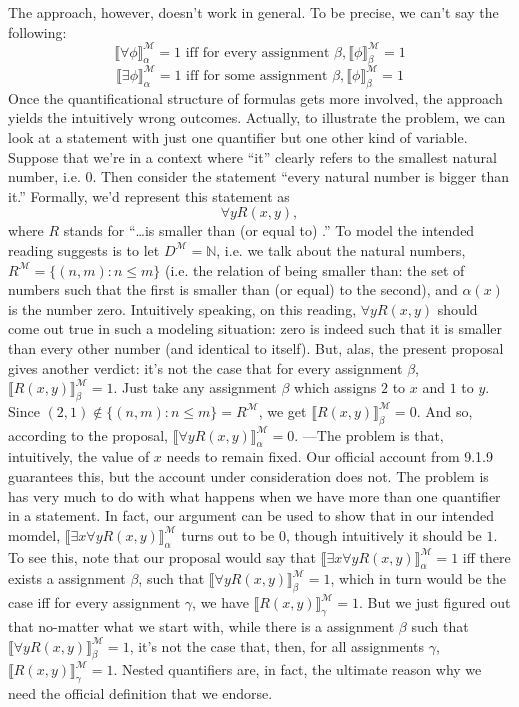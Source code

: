 \begin{enumerate}[\thesection.1]
	The approach, however, doesn't work in general. To be precise, we can't say the following:
	 \[\llbracket \forall \phi\rrbracket^\mathcal{M}_\alpha=1\text{ iff for every assignment }\beta, \llbracket \phi\rrbracket^\mathcal{M}_\beta=1\]
	  \[\llbracket \exists \phi\rrbracket^\mathcal{M}_\alpha=1\text{ iff for some assignment }\beta, \llbracket \phi\rrbracket^\mathcal{M}_\beta=1\]
	Once the quantificational structure of formulas gets more involved, the approach yields the intuitively wrong outcomes. Actually, to illustrate the problem, we can look at a statement with just one quantifier but one other kind of variable. Suppose that we're in a context where ``it'' clearly refers to the smallest natural number, i.e. 0. Then consider the statement ``every natural number is bigger than it.'' Formally, we'd represent this statement as \[\forall yR(x,y),\] where $R$ stands for ``\dots is smaller than (or equal to) \underline{\phantom{\dots}}.'' To model the intended reading suggests is to let $D^\mathcal{M}=\mathbb{N}$, i.e. we talk about the natural numbers, $R^\mathcal{M}=\{(n,m):n\leq m\}$ (i.e. the relation of being smaller than: the set of numbers such that the first is smaller than (or equal) to the second), and $\alpha(x)$ is the number zero. Intuitively speaking, on this reading, $\forall yR(x,y)$ should come out true in such a modeling situation: zero is indeed such that it is smaller than every other number (and identical to itself). But, alas, the present proposal gives another verdict: it's not the case that for every assignment $\beta$, $\llbracket R(x,y)\rrbracket^\mathcal{M}_\beta=1$. Just take any assignment $\beta$ which assigns $2$ to $x$ and $1$ to $y$. Since $(2,1)\notin \{(n,m):n\leq m\}=R^\mathcal{M}$, we get $\llbracket R(x,y)\rrbracket^\mathcal{M}_\beta=0$. And so, according to the proposal, $\llbracket \forall yR(x,y)\rrbracket^\mathcal{M}_\alpha=0$. ---The problem is that, intuitively, the value of $x$ needs to remain fixed. Our official account from 9.1.9 guarantees this, but the account under consideration does not. The problem is has very much to do with what happens when we have more than one quantifier in a statement. In fact, our argument can be used to show that in our intended momdel,  $\llbracket \exists x\forall yR(x,y)\rrbracket^\mathcal{M}_\alpha$ turns out to be $0$, though intuitively it should be $1$. To see this, note that our proposal would say that $\llbracket \exists x\forall yR(x,y)\rrbracket^\mathcal{M}_\alpha=1$ iff there exists a assignment $\beta$, such that $\llbracket \forall yR(x,y)\rrbracket^\mathcal{M}_\beta=1$, which in turn would be the case iff for every assignment $\gamma$, we have $\llbracket R(x,y)\rrbracket^\mathcal{M}_\gamma=1$. But we just figured out that no-matter what we start with, while there is a assignment $\beta$ such that  $\llbracket \forall yR(x,y)\rrbracket^\mathcal{M}_\beta=1$, it's not the case that, then, for all assignments $\gamma$, $\llbracket R(x,y)\rrbracket^\mathcal{M}_\gamma=1$. Nested quantifiers are, in fact, the ultimate reason why we need the official definition that we endorse.
	

\end{enumerate}
